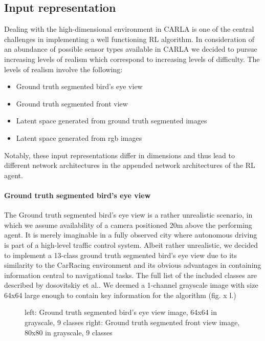 \documentclass[letterpaper, 10 pt, conference]{ieeeconf}  %
\begin{document}
\subsection{Input representation}
Dealing with the high-dimensional environment in CARLA is one of the central challenges in implementing a well functioning 
RL algorithm. In consideration of an abundance of possible sensor types available in CARLA we decided to pursue increasing
levels of realism which correspond to increasing levels of difficulty. The levels of realism involve the following:
\begin{itemize}
    \item Ground truth segmented bird's eye view
    \item Ground truth segmented front view
    \item Latent space generated from ground truth segmented images
    \item Latent space generated from rgb images
\end{itemize}
Notably, these input representations differ in dimensions and thus lead to different network architectures in the appended network architectures 
of the RL agent. 
\paragraph{Ground truth segmented bird's eye view}
The Ground truth segmented bird's eye view is a rather unrealistic scenario, in which we assume availability of a camera positioned 
20m above the performing agent. It is merely imaginable in a fully observed city where autonomous driving is part of a high-level traffic 
control system. Albeit rather unrealistic, we decided to implement a 13-class ground truth segmented bird's eye view due to its similarity to 
the CarRacing 
environment and its obvious advantages in containing information central to navigational tasks. The full list of the 
included classes are described by dosovitskiy et al.\cite{dosovitskiy2017carla}. We deemed a 1-channel 
grayscale image with size 64x64 
large enough to contain key information for the algorithm (fig. x l.)

\begin{figure}[thpb]
    \centering
    \caption{left: Ground truth segmented bird's eye view image, 64x64 in grayscale, 9 classes
    right: Ground truth segmented front view image, 80x80 in grayscale, 9 classes}
        \label{figurelabel}
        \end{figure}
\end{document}
